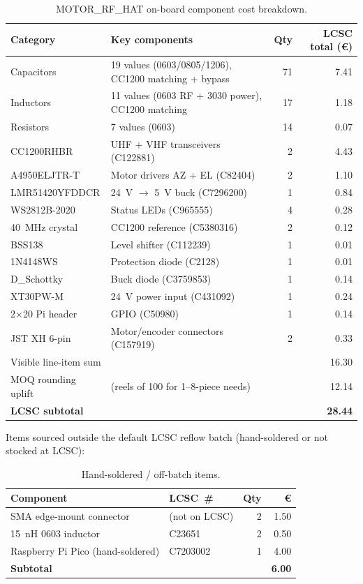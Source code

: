 \begin{table}[H]
    \centering
    \begin{tabularx}{\textwidth}{lXrr}
        \toprule
        Category & Key components & Qty & LCSC total (\euro{}) \\
        \midrule
        Capacitors & 19 values (0603/0805/1206), CC1200 matching + bypass & 71 & 7.41 \\
        Inductors & 11 values (0603 RF + 3030 power), CC1200 matching & 17 & 1.18 \\
        Resistors & 7 values (0603) & 14 & 0.07 \\
        CC1200RHBR & UHF + VHF transceivers (C122881) & 2 & 4.43 \\
        A4950ELJTR-T & Motor drivers AZ + EL (C82404) & 2 & 1.10 \\
        LMR51420YFDDCR & 24~V $\to$ 5~V buck (C7296200) & 1 & 0.84 \\
        WS2812B-2020 & Status LEDs (C965555) & 4 & 0.28 \\
        40~MHz crystal & CC1200 reference (C5380316) & 2 & 0.12 \\
        BSS138 & Level shifter (C112239) & 1 & 0.01 \\
        1N4148WS & Protection diode (C2128) & 1 & 0.01 \\
        D\_Schottky & Buck diode (C3759853) & 1 & 0.14 \\
        XT30PW-M & 24~V power input (C431092) & 1 & 0.24 \\
        2$\times$20 Pi header & GPIO (C50980) & 1 & 0.14 \\
        JST XH 6-pin & Motor/encoder connectors (C157919) & 2 & 0.33 \\
        \midrule
        Visible line-item sum & & & 16.30 \\
        MOQ rounding uplift & (reels of 100 for 1--8-piece needs) & & 12.14 \\
        \textbf{LCSC subtotal} & & & \textbf{28.44} \\
        \bottomrule
    \end{tabularx}
    \caption{MOTOR\_RF\_HAT on-board component cost breakdown.}
\end{table}

Items sourced outside the default LCSC reflow batch (hand-soldered or not stocked at LCSC):

\begin{table}[H]
    \centering
    \begin{tabular}{llrr}
        \toprule
        Component & LCSC~\# & Qty & \euro{} \\
        \midrule
        SMA edge-mount connector & (not on LCSC) & 2 & 1.50 \\
        15~nH 0603 inductor & C23651 & 2 & 0.50 \\
        Raspberry Pi Pico (hand-soldered) & C7203002 & 1 & 4.00 \\
        \midrule
        \textbf{Subtotal} & & & \textbf{6.00} \\
        \bottomrule
    \end{tabular}
    \caption{Hand-soldered / off-batch items.}
\end{table}

